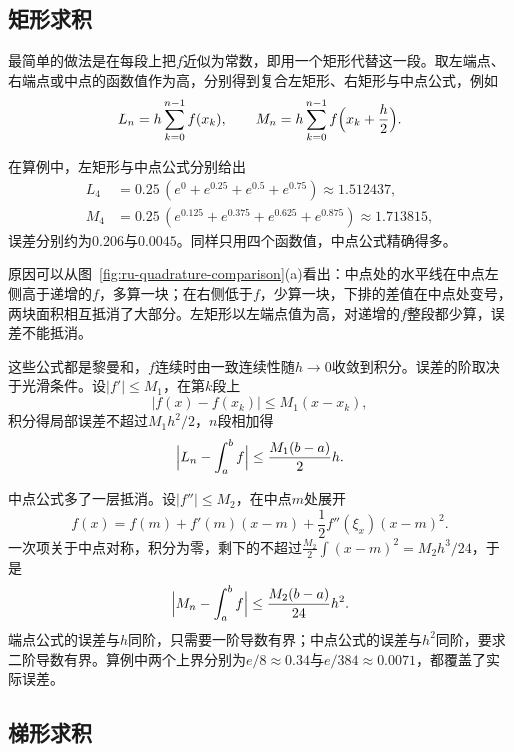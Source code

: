 \subsection{矩形求积}
\label{sec:ru-rectangle-rule}

最简单的做法是在每段上把$f$近似为常数，即用一个矩形代替这一段。取左端点、右端点或中点的函数值作为高，分别得到复合左矩形、右矩形与中点公式，例如
\begin{equation}
 L_n=h\sum_{k=0}^{n-1}f(x_k),\qquad M_n=h\sum_{k=0}^{n-1}f\Bigl(x_k+\frac h2\Bigr).
 \label{eq:ru-rectangle-rules}
\end{equation}

在算例中，左矩形与中点公式分别给出
\[
 \begin{aligned}
 L_4&=0.25\,(e^0+e^{0.25}+e^{0.5}+e^{0.75})\approx1.512437,\\
 M_4&=0.25\,(e^{0.125}+e^{0.375}+e^{0.625}+e^{0.875})\approx1.713815,
 \end{aligned}
\]
误差分别约为$0.206$与$0.0045$。同样只用四个函数值，中点公式精确得多。

原因可以从图~\ref{fig:ru-quadrature-comparison}(a)看出：中点处的水平线在中点左侧高于递增的$f$，多算一块；在右侧低于$f$，少算一块，下排的差值在中点处变号，两块面积相互抵消了大部分。左矩形以左端点值为高，对递增的$f$整段都少算，误差不能抵消。

这些公式都是黎曼和，$f$连续时由一致连续性随$h\to0$收敛到积分。误差的阶取决于光滑条件。设$|f'|\leq M_1$，在第$k$段上
\[
 |f(x)-f(x_k)|\leq M_1(x-x_k),
\]
积分得局部误差不超过$M_1h^2/2$，$n$段相加得
\begin{equation}
 \Bigl|L_n-\int_a^bf\Bigr|\leq\frac{M_1(b-a)}2h.
 \label{eq:ru-left-rectangle-error}
\end{equation}

中点公式多了一层抵消。设$|f''|\leq M_2$，在中点$m$处展开
\[
 f(x)=f(m)+f'(m)(x-m)+\frac12f''(\xi_x)(x-m)^2.
\]
一次项关于中点对称，积分为零，剩下的不超过$\frac{M_2}2\int(x-m)^2=M_2h^3/24$，于是
\begin{equation}
 \Bigl|M_n-\int_a^bf\Bigr|\leq\frac{M_2(b-a)}{24}h^2.
 \label{eq:ru-midpoint-error}
\end{equation}
端点公式的误差与$h$同阶，只需要一阶导数有界；中点公式的误差与$h^2$同阶，要求二阶导数有界。算例中两个上界分别为$e/8\approx0.34$与$e/384\approx0.0071$，都覆盖了实际误差。

\subsection{梯形求积}
\label{sec:ru-trapezoid-rule}

